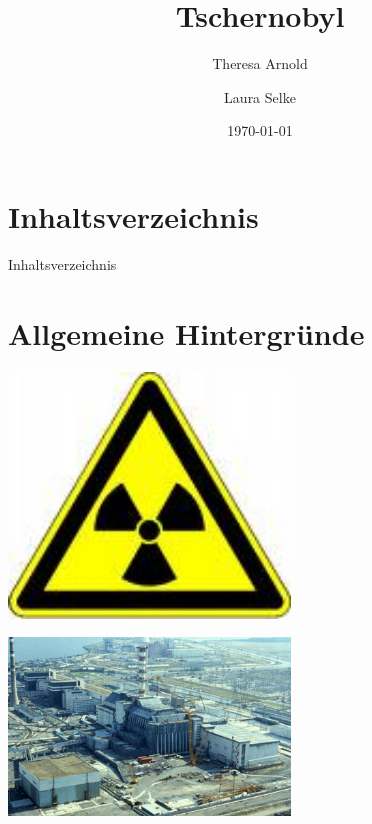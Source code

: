 \documentclass{beamer}
\title{Tschernobyl}
\date{\today}
\institute{Friedrich Engels Gymnasium - Biologie}
\author[T.Arnold \& L.Selke]{Theresa Arnold \and Laura Selke}
\begin{document}
\begin{frame}
    \titlepage
\end{frame}

\section*{Inhaltsverzeichnis}
\begin{frame}{Inhaltsverzeichnis}
    \tableofcontents[pausesections]
\end{frame}

\section{Allgemeine Hintergründe}
\begin{frame}{}
    \begin{center}
        \includegraphics[width=7.5cm]{img/atomwarn.jpg}\\
    \end{center}
\end{frame}

\begin{frame}{}
    \begin{center}
        \includegraphics[width=7.5cm]{img/allgemein2.jpg}\\
        \begin{block}{}
        \end{block}
    \end{center}
\end{frame}
\end{document}

